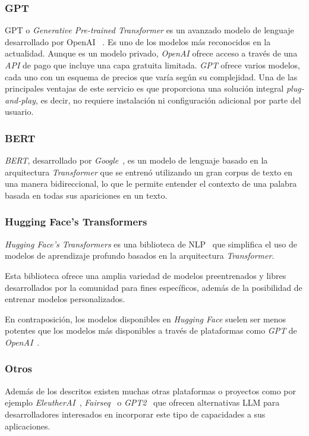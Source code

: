 \subsubsection*{GPT}
GPT o \textit{Generative Pre-trained Transformer} es un avanzado modelo de lenguaje desarrollado por OpenAI
~\cite{article_brown_2020}.
Es uno de los modelos más reconocidos en la actualidad.
Aunque es un modelo privado, \textit{OpenAI} ofrece acceso a través de una \textit{API} de pago que incluye una capa
gratuita limitada.
\textit{GPT} ofrece varios modelos, cada uno con un esquema de precios que varía según su complejidad.
Una de las principales ventajas de este servicio es que proporciona una solución integral \textit{plug-and-play}, es
decir, no requiere instalación ni configuración adicional por parte del usuario.

\subsubsection*{BERT}
\textit{BERT}, desarrollado por \textit{Google}~\cite{article_devlin_2019}, es un modelo de lenguaje basado en la
arquitectura \textit{Transformer} que se entrenó utilizando un gran corpus de texto en una manera bidireccional, lo
que le permite entender el contexto de una palabra basada en todas sus apariciones en un texto.

\subsubsection*{Hugging Face's Transformers}

\textit{Hugging Face's Transformers} es una biblioteca de NLP~\cite{article_wolf_2020} que simplifica el uso de modelos
de aprendizaje profundo basados en la arquitectura \textit{Transformer}.

Esta biblioteca ofrece una amplia variedad de modelos preentrenados y libres desarrollados por la comunidad para fines
específicos, además de la posibilidad de entrenar modelos personalizados.

En contraposición, los modelos disponibles en \textit{Hugging Face}
suelen ser menos potentes que los modelos más disponibles a través de plataformas como \textit{GPT} de
\textit{OpenAI}~\cite{url_chatgpt_vs_huggingchat}.

\subsubsection*{Otros}

Además de los descritos existen muchas otras plataformas o proyectos como por ejemplo
\textit{EleutherAI}~\cite{url_eleutherai}, \textit{Fairseq}~\cite{url_fairseq} o \textit{GPT2}~\cite{url_gpt2}
que ofrecen alternativas LLM para desarrolladores interesados en incorporar este tipo de capacidades a sus aplicaciones.
